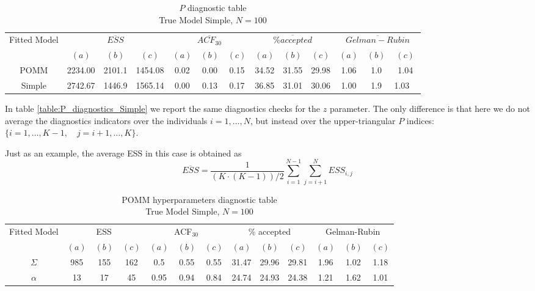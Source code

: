 \documentclass[11pt]{amsart}
\begin{document}
\begin{table}[h]
\centering
\caption{
{\large $P$ diagnostic table} \\ 
{\small True Model Simple, $N=100$}
} 
\begin{tabular}{ccccccccccccc}
\toprule
\multirow{2}{*}{Fitted Model} & \multicolumn{3}{c}{$\overline{ESS}$} & \multicolumn{3}{c}{
$\overline{ACF_{30}}$} & \multicolumn{3}{c}{$\overline{\% accepted}$} & \multicolumn{3}{c}{$\overline{Gelman-Rubin}$}\\
\cmidrule(lr){2-4} \cmidrule(lr){5-7} \cmidrule(lr){8-10} \cmidrule(lr){11-13} 
& $(a)$ & $(b)$ & $(c)$ & $(a)$ & $(b)$ & $(c)$ & $(a)$ & $(b)$ & $(c)$ & $(a)$ & $(b)$ & $(c)$ \\
\midrule
POMM & 2234.00 & 2101.1 & 1454.08 & 0.02 & 0.00 & 0.15 & 34.52 & 31.55 & 29.98 & 1.06 & 1.0 & 1.04  \\
Simple &2742.67 & 1446.9 & 1565.14 & 0.00 & 0.13 & 0.17 & 36.85 & 31.01 & 30.06 & 1.00 & 1.9 & 1.03 \ \\
\bottomrule
\end{tabular}
\label{table:P_diagnostics_Simple}
\end{table}


In table \eqref{table:P_diagnostics_Simple} we report the same diagnostics checks for the $z$ parameter. The only difference is that here we do not average the diagnostics indicators over the individuals $i= 1,\ldots,N$, but instead over the upper-triangular $P$ indices: $\{ i =1,\ldots, K-1, \quad j = i+1, \ldots, K \}$.

Just as an example, the average ESS in this case is obtained as
$$
\overline{ESS} = \frac{1}{(K \cdot (K-1))/2} \sum_{i=1}^{N-1} \sum_{j=i+1}^N ESS_{i,j}
$$




\begin{table}[h]
\centering
\caption{
{\large POMM hyperparameters diagnostic table} \\ 
{\small True Model Simple, $N=100$}
} 
\begin{tabular}{ccccccccccccc}
\toprule
\multirow{2}{*}{Fitted Model} & \multicolumn{3}{c}{ESS} & \multicolumn{3}{c}{
ACF$_{30}$} & \multicolumn{3}{c}{$\%$ accepted} & \multicolumn{3}{c}{Gelman-Rubin}\\
\cmidrule(lr){2-4} \cmidrule(lr){5-7} \cmidrule(lr){8-10} \cmidrule(lr){11-13} 
& $(a)$ & $(b)$ & $(c)$ & $(a)$ & $(b)$ & $(c)$ & $(a)$ & $(b)$ & $(c)$ & $(a)$ & $(b)$ & $(c)$ \\
\midrule
$\Sigma$ &985 & 155 & 162 & 0.5 & 0.55 & 0.55 & 31.47 & 29.96 & 29.81 & 1.96 & 1.02 & 1.18 \\
$\alpha$ &13 & 17 & 45 & 0.95 & 0.94 & 0.84 & 24.74 & 24.93 & 24.38 & 1.21 & 1.62 & 1.01 \\
\bottomrule
\end{tabular}
\label{table:P_hyper_Simple}
\end{table}
\end{document}
